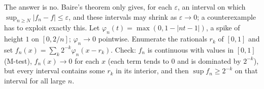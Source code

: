 \documentclass[11pt,a4paper]{article}
\begin{document}
The answer is no. Baire's theorem only gives, for each \(\varepsilon\), an interval on which \(\sup_{n\ge N}\lvert f_n-f\rvert\le\varepsilon\), and these intervals may shrink as \(\varepsilon\to0\); a counterexample has to exploit exactly this.
Let \(\varphi_n(t)=\max(0,1-\lvert nt-1\rvert)\), a spike of height \(1\) on \([0,2/n]\); \(\varphi_n\to0\) pointwise. Enumerate the rationals \(r_k\) of \([0,1]\) and set \(f_n(x)=\sum_k2^{-k}\varphi_n(x-r_k)\).
Check: \(f_n\) is continuous with values in \([0,1]\) (M-test), \(f_n(x)\to0\) for each \(x\) (each term tends to \(0\) and is dominated by \(2^{-k}\)), but every interval contains some \(r_k\) in its interior, and then \(\sup f_n\ge2^{-k}\) on that interval for all large \(n\).
\end{document}
